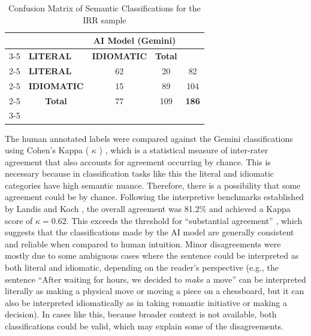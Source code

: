 \documentclass[11pt,a4paper]{article}
\begin{document}
\vspace{1em}
\begin{table}[H]
    \centering
    \renewcommand{\arraystretch}{1.5}
    \caption[IRR Confusion Matrix]{Confusion Matrix of Semantic Classifications for the IRR sample}
    \label{tab:confusion_matrix}
    \begin{tabular}{c|l|c|c|c|}
        \multicolumn{2}{c}{} & \multicolumn{2}{c}{\textbf{AI Model (Gemini)}} & \multicolumn{1}{c}{} \\
        \cline{3-5}
        \multicolumn{2}{c|}{} & \textbf{LITERAL} & \textbf{IDIOMATIC} & \textbf{Total} \\
        \cline{2-5}
        \multirow{2}{*}{\textbf{Human Rater}} & \textbf{LITERAL} & 62 & 20 & 82 \\
        \cline{2-5}
        & \textbf{IDIOMATIC} & 15 & 89 & 104 \\
        \cline{2-5}
        \multicolumn{1}{c}{} & \multicolumn{1}{c|}{\textbf{Total}} & 77 & 109 & \textbf{186} \\
        \cline{3-5}
    \end{tabular}
    \vspace{0.5em}
\end{table}
\vspace{1em}

The human annotated labels were compared against the Gemini classifications using Cohen's Kappa ( $\kappa$ ) \parencite*{cohenCoefficientAgreementNominal1960}, which is a statistical measure of inter-rater agreement that also accounts for agreement occurring by chance. This is necessary because in classification tasks like this the literal and idiomatic categories have high semantic nuance. Therefore, there is a possibility that some agreement could be by chance. Following the interpretive benchmarks established by Landis and Koch \parencite*{landisMeasurementObserverAgreement1977}, the overall agreement was 81.2\% and achieved a Kappa score of $\kappa=0.62$. This exceeds the threshold for ``substantial agreement'' \parencite{landisMeasurementObserverAgreement1977}, which suggests that the classifications made by the AI model are generally consistent and reliable when compared to human intuition. Minor disagreements were mostly due to some ambiguous cases where the sentence could be interpreted as both literal and idiomatic, depending on the reader's perspective (e.g., the sentence ``After waiting for hours, we decided to \textit{make} a move'' can be interpreted literally as making a physical move or moving a piece on a chessboard, but it can also be interpreted idiomatically as in taking romantic initiative or making a decision). In cases like this, because broader context is not available, both classifications could be valid, which may explain some of the disagreements. 
\end{document}
